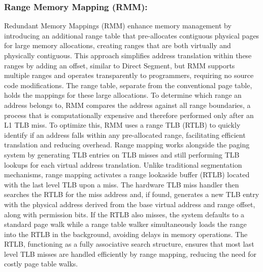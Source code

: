 \subsubsection{Range Memory Mapping (RMM):}
Redundant Memory Mappings (RMM)\cite{karakostas_redundant_2015} enhance memory management by introducing an additional range table 
that pre-allocates contiguous physical pages for large memory allocations, creating ranges that 
are both virtually and physically contiguous. This approach simplifies address translation 
within these ranges by adding an offset, similar to Direct Segment, but RMM supports multiple 
ranges and operates transparently to programmers, requiring no source code modifications. 
The range table, separate from the conventional page table, holds the mappings for these 
large allocations. To determine which range an address belongs to, RMM compares the address 
against all range boundaries, a process that is computationally expensive and therefore performed 
only after an L1 TLB miss. To optimize this, RMM uses a range TLB (RTLB) to quickly identify 
if an address falls within any pre-allocated range, facilitating efficient translation and 
reducing overhead. Range mapping works alongside the paging system by generating TLB entries on 
TLB misses and still performing TLB lookups for each virtual address translation. 
Unlike traditional segmentation mechanisms, range mapping activates a range lookaside 
buffer (RTLB) located with the last level TLB upon a miss. The hardware TLB miss 
handler then searches the RTLB for the miss address and, if found, generates a new 
TLB entry with the physical address derived from the base virtual address and 
range offset, along with permission bits. If the RTLB also misses, the system 
defaults to a standard page walk while a range table walker simultaneously 
loads the range into the RTLB in the background, avoiding delays in memory operations. 
The RTLB, functioning as a fully associative search structure, ensures 
that most last level TLB misses are handled efficiently by range mapping, 
reducing the need for costly page table walks.

